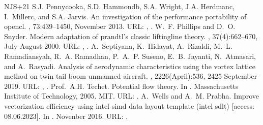 \documentclass[a4paper,12pt,english]{jupyterBook}
\begin{document}
\begin{sphinxthebibliography}{NJS+21}
\sphinxAtStartPar
S.J. Pennycooka, S.D. Hammondb, S.A. Wright, J.A. Herdmanc, I. Millerc, and S.A. Jarvis. An investigation of the performance portability of opencl. , 73:439–1450, November 2013. URL: , .
\sphinxAtStartPar
W. F. Phillips and D. O. Snyder. Modern adaptation of prandtl's classic lifting\sphinxhyphen{}line theory. , 37(4):662–670, July \sphinxhyphen{} August 2000. URL: , .
\sphinxAtStartPar
A. Septiyana, K. Hidayat, A. Rizaldi, M. L. Ramadiansyah, R. A. Ramadhan, P. A. P. Suseno, E. B. Jayanti, N. Atmasari, and A. Rasyadi. Analysis of aerodynamic characteristics using the vortex lattice method on twin tail boom unmanned aircraft. , 2226(April):536, 24\sphinxhyphen{}25 September 2019. URL: , .
\sphinxAtStartPar
Prof. A.H. Techet. Potential flow theory. In . Massachusetts Institute of Technology, 2005. MIT. URL: .
\sphinxAtStartPar
A. Wells and A. M. Prabha. Improve vectorization efficiency using intel simd data layout template (intel sdlt) {[}access: 08.06.2023{]}. In . Novenber 2016. URL: .
\end{sphinxthebibliography}







\renewcommand{\indexname}{Index}
\printindex
\end{document}
